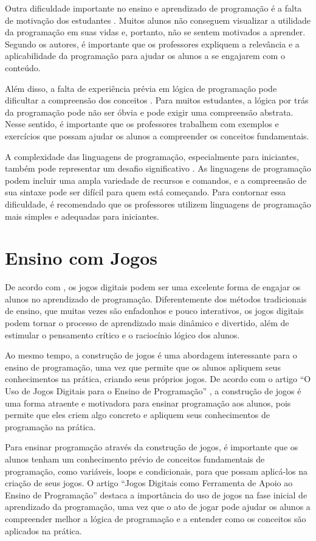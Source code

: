 Outra dificuldade importante no ensino e aprendizado de programação é a falta de motivação dos estudantes \cite{Silva2014}. Muitos alunos não conseguem visualizar a utilidade da programação em suas vidas e, portanto, não se sentem motivados a aprender. Segundo os autores, é importante que os professores expliquem a relevância e a aplicabilidade da programação para ajudar os alunos a se engajarem com o conteúdo.

Além disso, a falta de experiência prévia em lógica de programação pode dificultar a compreensão dos conceitos \cite{Silva2014}. Para muitos estudantes, a lógica por trás da programação pode não ser óbvia e pode exigir uma compreensão abstrata. Nesse sentido, é importante que os professores trabalhem com exemplos e exercícios que possam ajudar os alunos a compreender os conceitos fundamentais.

A complexidade das linguagens de programação, especialmente para iniciantes, também pode representar um desafio significativo \cite{Silva2014}. As linguagens de programação podem incluir uma ampla variedade de recursos e comandos, e a compreensão de sua sintaxe pode ser difícil para quem está começando. Para contornar essa dificuldade, é recomendado que os professores utilizem linguagens de programação mais simples e adequadas para iniciantes.

\section{Ensino com Jogos}

De acordo com , os jogos digitais podem ser uma excelente forma de engajar os alunos no aprendizado de programação. Diferentemente dos métodos tradicionais de ensino, que muitas vezes são enfadonhos e pouco interativos, os jogos digitais podem tornar o processo de aprendizado mais dinâmico e divertido, além de estimular o pensamento crítico e o raciocínio lógico dos alunos.

Ao mesmo tempo, a construção de jogos é uma abordagem interessante para o ensino de programação, uma vez que permite que os alunos apliquem seus conhecimentos na prática, criando seus próprios jogos. De acordo com o artigo ``O Uso de Jogos Digitais para o Ensino de Programação'' , a construção de jogos é uma forma atraente e motivadora para ensinar programação aos alunos, pois permite que eles criem algo concreto e apliquem seus conhecimentos de programação na prática.

Para ensinar programação através da construção de jogos, é importante que os alunos tenham um conhecimento prévio de conceitos fundamentais de programação, como variáveis, loops e condicionais, para que possam aplicá-los na criação de seus jogos. O artigo ``Jogos Digitais como Ferramenta de Apoio ao Ensino de Programação''  destaca a importância do uso de jogos na fase inicial de aprendizado da programação, uma vez que o ato de jogar pode ajudar os alunos a compreender melhor a lógica de programação e a entender como os conceitos são aplicados na prática.

